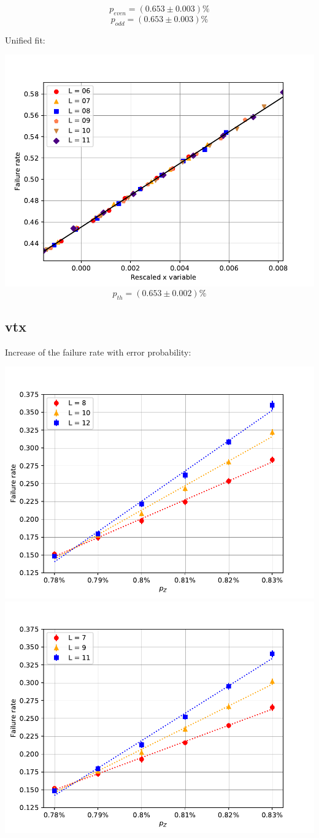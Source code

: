 \documentclass[pra]{revtex4-1}
\begin{document}
\[  p_{even} = (0.653 \pm 0.003)\% \]
\[  p_{odd} = (0.653 \pm 0.003)\% \]
\clearpage 

Unified fit: \begin{center} 

\includegraphics[width=.9\textwidth]{../graphs-paper2/vck-dephasing-rescaled.pdf}
\[  p_{th} = (0.653 \pm 0.002)\% \] \end{center}
\clearpage 

\subsection*{vtx}
\noindent Increase of the failure rate with error probability: 
  
\includegraphics[width=.49\textwidth]{../graphs-paper2/vtx-dephasing-even.pdf}
\includegraphics[width=.49\textwidth]{../graphs-paper2/vtx-dephasing-odd.pdf}
\end{document}
